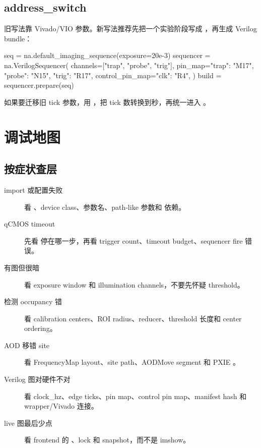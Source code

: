 \documentclass[11pt,oneside,openany]{book}
\begin{document}
\section{address\_switch}
旧写法靠 Vivado/VIO 参数。新写法推荐先把一个实验阶段写成 ，再生成 Verilog bundle：
\begin{codeblock}[Python]
seq = na.default_imaging_sequence(exposure=20e-3)
sequencer = na.VerilogSequencer(
    channels=["trap", "probe", "trig"],
    pin_map={"trap": "M17", "probe": "N15", "trig": "R17"},
    control_pin_map={"clk": "R4"},
)
build = sequencer.prepare(seq)
\end{codeblock}
如果要迁移旧 tick 参数，用 ，把 tick 数转换到秒，再统一进入 。

\chapter{调试地图}
\section{按症状查层}
\begin{description}
  \item[import 或配置失败] 看 、device class、参数名、path-like 参数和  依赖。
  \item[qCMOS timeout] 先看  停在哪一步，再看 trigger count、timeout budget、sequencer fire 错误。
  \item[有图但很暗] 看 exposure window 和 illumination channels，不要先怀疑 threshold。
  \item[检测 occupancy 错] 看 calibration centers、ROI radius、reducer、threshold 长度和 center ordering。
  \item[AOD 移错 site] 看 FrequencyMap layout、site path、AODMove segment 和 PXIE 。
  \item[Verilog 图对硬件不对] 看 clock\_hz、edge ticks、pin map、control pin map、manifest hash 和 wrapper/Vivado 连接。
  \item[live 图最后少点] 看 frontend 的 、lock 和  snapshot，而不是 imshow。
\end{description}
\end{document}
